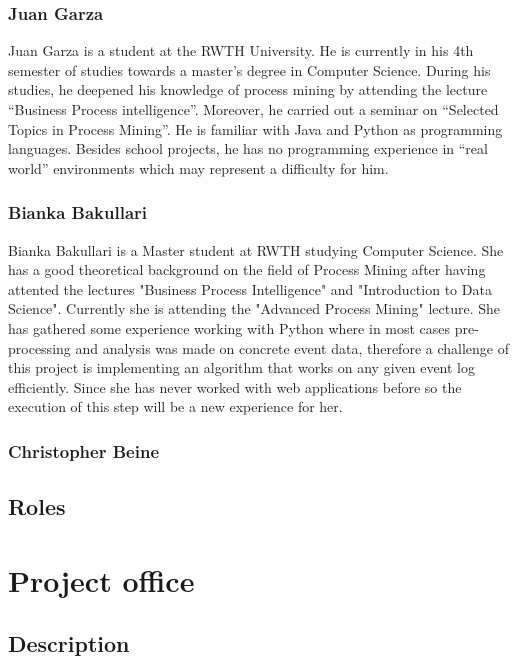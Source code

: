\documentclass[notitlepage]{article}
\begin{document}
\begin{flushleft}
\subsubsection*{Juan Garza}

Juan Garza is a student at the RWTH University. He is currently in his 4th semester of studies towards a master’s degree in Computer Science. During his studies, he deepened his knowledge of process mining by attending the lecture “Business Process intelligence”. Moreover, he carried out a seminar on “Selected Topics in Process Mining”. He is familiar with Java and Python as programming languages. Besides school projects, he has no programming experience in “real world” environments which may represent a difficulty for him. 

\subsubsection*{Bianka Bakullari}

Bianka Bakullari is a Master student at RWTH studying Computer Science.
She has a good theoretical background on the field of Process Mining after having attented the lectures "Business Process Intelligence" and "Introduction to Data Science". 
Currently she is attending the "Advanced Process Mining" lecture.
She has gathered some experience working with Python where in most cases pre-processing and analysis was made on concrete event data, therefore a challenge of this project is implementing an algorithm that works on any given event log efficiently.
Since she has never worked with web applications before so the execution of this step will be a new experience for her.

\subsubsection*{Christopher Beine}


\subsection{Roles}

\section{Project office}

\subsection{Description}

\newpage

  

\end{flushleft}
\end{document}
